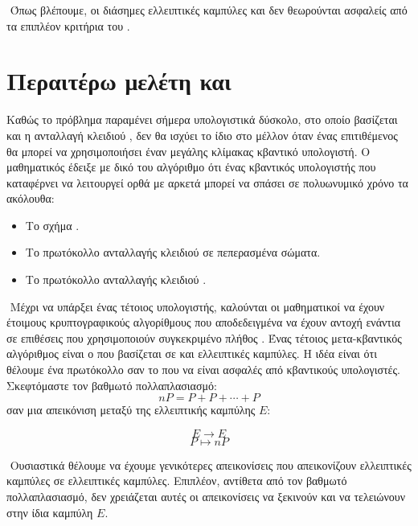 \documentclass[oneside,a4paper]{article}
\begin{document}
$ $\newline
Όπως βλέπουμε, οι διάσημες ελλειπτικές καμπύλες  και  δεν θεωρούνται ασφαλείς από τα επιπλέον κριτήρια του .

\pagebreak
\section{Περαιτέρω μελέτη και }

\vspace*{0.3cm}
\noindent Καθώς το πρόβλημα  παραμένει σήμερα υπολογιστικά δύσκολο, στο οποίο βασίζεται και η ανταλλαγή κλειδιού , δεν θα ισχύει το ίδιο στο μέλλον όταν ένας επιτιθέμενος θα μπορεί να χρησιμοποιήσει έναν μεγάλης κλίμακας κβαντικό υπολογιστή. Ο μαθηματικός  έδειξε με δικό του αλγόριθμο \cite{shor} ότι ένας κβαντικός υπολογιστής που καταφέρνει να λειτουργεί ορθά με αρκετά  μπορεί να σπάσει σε πολυωνυμικό χρόνο τα ακόλουθα:
\begin{itemize}
	\item Το σχήμα .
	\item Το πρωτόκολλο ανταλλαγής κλειδιού  σε πεπερασμένα σώματα.
	\item Το πρωτόκολλο ανταλλαγής κλειδιού .
\end{itemize} 

$ $\newline
Μέχρι να υπάρξει ένας τέτοιος υπολογιστής, καλούνται οι μαθηματικοί να έχουν έτοιμους κρυπτογραφικούς αλγορίθμους που αποδεδειγμένα να έχουν αντοχή ενάντια σε επιθέσεις που χρησιμοποιούν συγκεκριμένο πλήθος . Ένας τέτοιος μετα-κβαντικός αλγόριθμος είναι ο  που βασίζεται σε  και  ελλειπτικές καμπύλες. Η ιδέα είναι ότι θέλουμε ένα πρωτόκολλο σαν το  που να είναι ασφαλές από κβαντικούς υπολογιστές. Σκεφτόμαστε τον βαθμωτό πολλαπλασιασμό:
$$n P  = P + P + \cdots + P$$ σαν μια απεικόνιση μεταξύ της ελλειπτικής καμπύλης $E$:

$$ E \longrightarrow E$$
$$ P \longmapsto n P$$

$ $\newline
Ουσιαστικά θέλουμε να έχουμε γενικότερες απεικονίσεις που απεικονίζουν ελλειπτικές καμπύλες σε ελλειπτικές καμπύλες. Επιπλέον, αντίθετα από τον βαθμωτό πολλαπλασιασμό, δεν χρειάζεται αυτές οι απεικονίσεις να ξεκινούν και να τελειώνουν στην ίδια καμπύλη $E$. 
\end{document}
